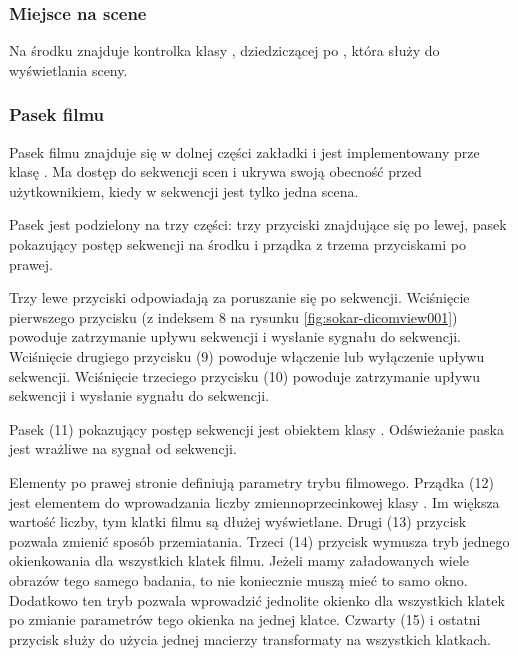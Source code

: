 \subsubsection{Miejsce na scene}
\label{sec:sokar-dicomgraphics}
\par
Na środku znajduje kontrolka klasy , dziedziczącej po , która służy do wyświetlania sceny.

\subsubsection{Pasek filmu}
\label{sec:sokar-moviebar}

\par
Pasek filmu znajduje się w dolnej części zakładki i jest implementowany prze klasę .
Ma dostęp do sekwencji scen i ukrywa swoją obecność przed użytkownikiem, kiedy w sekwencji jest tylko jedna scena.

\par
Pasek jest podzielony na trzy części: trzy przyciski znajdujące się po lewej, pasek pokazujący postęp sekwencji na środku i prządka z trzema przyciskami po prawej.

\par
Trzy lewe przyciski odpowiadają za poruszanie się po sekwencji.
Wciśnięcie pierwszego przycisku (z indeksem 8 na rysunku \ref{fig:sokar-dicomview001}) powoduje zatrzymanie upływu sekwencji i wysłanie sygnału  do sekwencji.
Wciśnięcie drugiego przycisku (9) powoduje włączenie lub wyłączenie upływu sekwencji.
Wciśnięcie trzeciego przycisku (10) powoduje zatrzymanie upływu sekwencji i wysłanie sygnału  do sekwencji.
\par
Pasek (11) pokazujący postęp sekwencji jest obiektem klasy .
Odświeżanie paska jest wrażliwe na sygnał  od sekwencji.
\par
Elementy po prawej stronie definiują parametry trybu filmowego.
Prządka (12) jest elementem do wprowadzania liczby zmiennoprzecinkowej klasy .
Im większa wartość liczby, tym klatki filmu są dłużej wyświetlane.
Drugi (13) przycisk pozwala zmienić sposób przemiatania.
Trzeci (14) przycisk wymusza tryb jednego okienkowania dla wszystkich klatek filmu.%
Jeżeli mamy załadowanych wiele obrazów tego samego badania, to nie koniecznie muszą mieć to samo okno.
Dodatkowo ten tryb pozwala wprowadzić jednolite okienko dla wszystkich klatek po zmianie parametrów tego okienka na jednej klatce.
Czwarty (15) i ostatni przycisk służy do użycia jednej macierzy transformaty na wszystkich klatkach.


